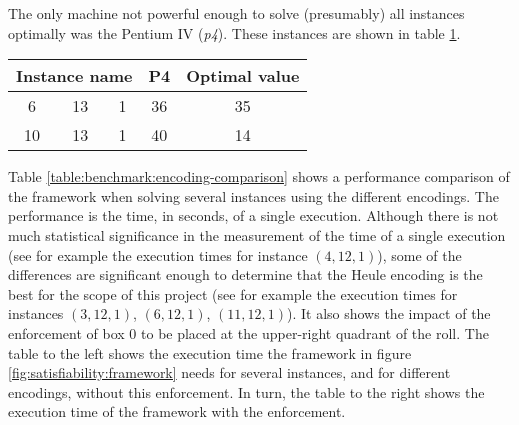 The only machine not powerful enough to solve (presumably) all instances optimally
was the Pentium IV (\textit{p4}). These instances are shown in table
\ref{table:benchmark:SAT-results:suboptimalinstances}.

\begin{table}[H]
\centering
	\begin{tabular}{ccccc}
		\multicolumn{3}{c}{Instance name}
					& P4		& Optimal value \\
		\midrule
		 6 & 13 & 1	& 36		& 35 \\
		10 & 13 & 1	& 40		& 14 \\
	\end{tabular}
	\label{table:benchmark:SAT-results:suboptimalinstances}
\end{table}

Table \ref{table:benchmark:encoding-comparison} shows a performance comparison of the
framework when solving several instances using the different encodings. The performance
is the time, in seconds, of a single execution. Although there is not much statistical
significance in the measurement of the time of a single execution (see for example the
execution times for instance $(4,12,1)$), some of the differences
are significant enough to determine that the Heule encoding is the best for the scope
of this project (see for example the execution times for instances $(3,12,1)$, $(6,12,1)$,
$(11,12,1)$). It also shows the impact of the enforcement of box 0 to be
placed at the upper-right quadrant of the roll. The table to the left shows the execution time
the framework in figure \ref{fig:satisfiability:framework} needs for several instances,
and for different encodings, without this enforcement. In turn, the table to the right
shows the execution time of the framework with the enforcement.

